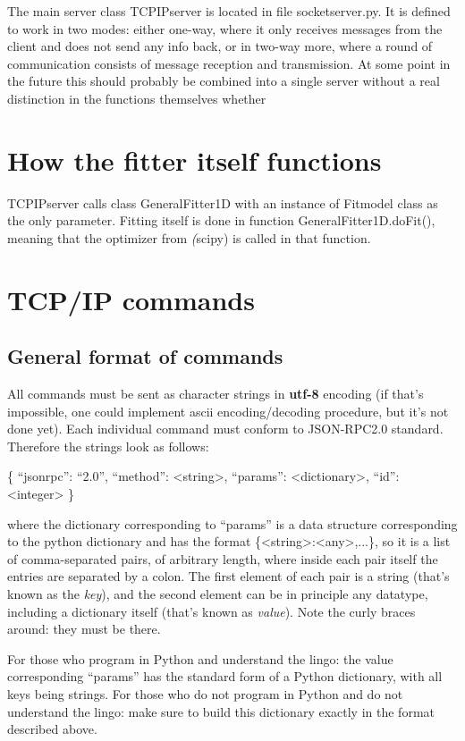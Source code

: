 \documentclass[11pt]{article} %
\begin{document}
The main server class { TCPIPserver} is located in file { socketserver.py}. It is defined to work in two modes: either one-way, where it only receives messages from the client and does not send any info back, or in two-way more, where a round of communication consists of message reception and transmission. { At some point in the future this should probably be combined into a single server without a real distinction in the functions themselves whether }

\section{How the fitter itself functions}

{ TCPIPserver} calls class { GeneralFitter1D} with an instance of { Fitmodel} class as the only parameter. Fitting itself is done in function { GeneralFitter1D.doFit()}, meaning that the optimizer from \textit(scipy) is called in that function.  

\section{TCP/IP commands}

\subsection{General format of commands}

All commands must be sent as character strings in \textbf{utf-8} encoding (if that's impossible, one could implement ascii encoding/decoding procedure, but it's not done yet). Each individual command must conform to JSON-RPC2.0 standard. Therefore the strings look as follows:

\begin{tcolorbox}[title=JSON-RPC2.0 command format]


{\selectfont \{ ``jsonrpc'': ``2.0'', ``method'': <string>, ``params'': <dictionary>, ``id'': <integer> \}}

where the dictionary corresponding to ``params'' is a data structure corresponding to the python dictionary and has the format \{<string>:<any>,...\}, so it is a list of comma-separated pairs, of arbitrary length, where inside each pair itself the entries are separated by a colon. The first element of each pair is a string (that's known as the \textit{key}), and the second element can be in principle any datatype, including a dictionary itself (that's known as \textit{value}). Note the curly braces around: they must be there. 

For those who program in Python and understand the lingo: the value corresponding ``params'' has the standard form of a Python dictionary, with all keys being strings. For those who do not program in Python and do not understand the lingo: make sure to build this dictionary exactly in the format described above. 

\end{tcolorbox}
\end{document}
